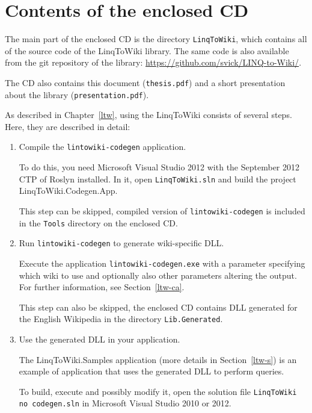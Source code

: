 \chapter{Contents of the enclosed CD}
\label{cd}

The main part of the enclosed CD is the directory \texttt{LinqToWiki},
which contains all of the source code of the LinqToWiki library.
The same code is also available from the git repository of the library:
\url{https://github.com/svick/LINQ-to-Wiki/}.

The CD also contains this document (\texttt{thesis.pdf})
and a short presentation about the library (\texttt{presentation.pdf}).


As described in Chapter~\ref{ltw}, using the LinqToWiki consists of several steps.
Here, they are described in detail:

\begin{enumerate}
\item Compile the \texttt{lintowiki-codegen} application.

To do this, you need Microsoft Visual Studio 2012 with the September 2012 \ac{CTP} of Roslyn installed.
In it, open \texttt{LinqToWiki.sln} and build the project LinqToWiki.Codegen.App.

This step can be skipped, compiled version of \texttt{lintowiki-codegen} is included
in the \texttt{Tools} directory on the enclosed CD.

\item Run \texttt{lintowiki-codegen} to generate wiki-specific \ac{DLL}.

Execute the application \texttt{lintowiki-codegen.exe} with a parameter specifying which wiki
to use and optionally also other parameters altering the output. For further information, see Section~\ref{ltw-ca}.

This step can also be skipped, the enclosed CD contains \ac{DLL} generated for the English Wikipedia
in the directory \texttt{Lib\string\LinqToWiki.Generated}.

\item Use the generated \ac{DLL} in your application.

The LinqToWiki.Samples application (more details in Section~\ref{ltw-s}) is an example of application
that uses the generated \ac{DLL} to perform queries.

To build, execute and possibly modify it, open the solution file \texttt{LinqToWiki no codegen.sln}
in Microsoft Visual Studio 2010 or 2012.
\end{enumerate}